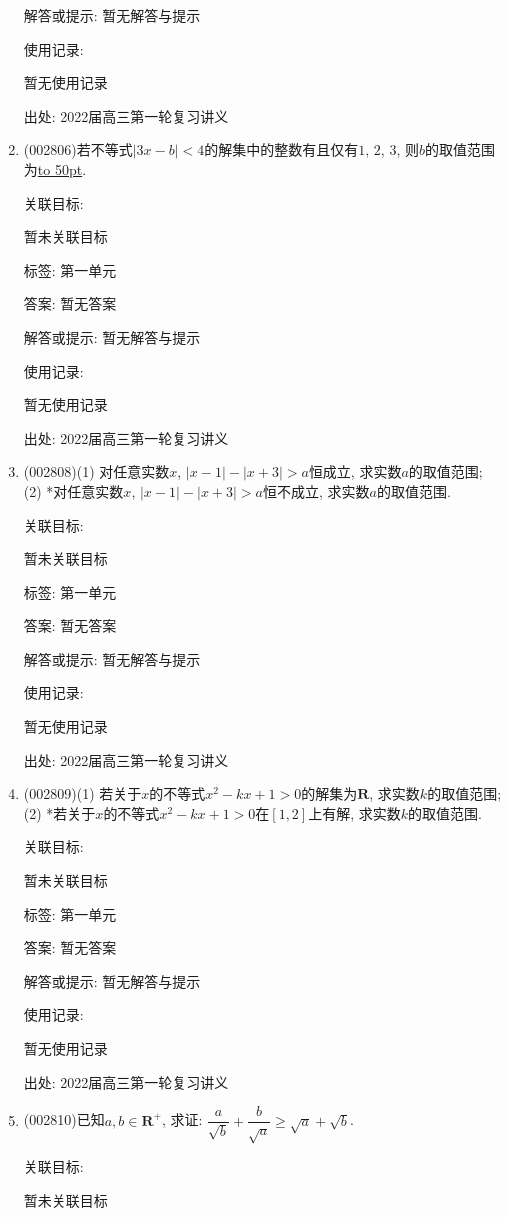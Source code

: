 \documentclass[10pt,a4paper]{article}
\newcommand{\blank}[1]{\underline{\hbox to #1pt{}}}
\begin{document}
\begin{enumerate}[1.]
解答或提示: 暂无解答与提示

使用记录:

暂无使用记录


出处: 2022届高三第一轮复习讲义
\item { (002806)}若不等式$|3x-b|<4$的解集中的整数有且仅有$1$, $2$, $3$, 则$b$的取值范围为\blank{50}.


关联目标:

暂未关联目标



标签: 第一单元

答案: 暂无答案

解答或提示: 暂无解答与提示

使用记录:

暂无使用记录


出处: 2022届高三第一轮复习讲义
\item { (002808)}(1) 对任意实数$x$, $|x-1|-|x+3|>a$恒成立, 求实数$a$的取值范围;\\
(2) *对任意实数$x$, $|x-1|-|x+3|>a$恒不成立, 求实数$a$的取值范围.


关联目标:

暂未关联目标



标签: 第一单元

答案: 暂无答案

解答或提示: 暂无解答与提示

使用记录:

暂无使用记录


出处: 2022届高三第一轮复习讲义
\item { (002809)}(1) 若关于$x$的不等式$x^2-kx+1>0$的解集为$\mathbf{R}$, 求实数$k$的取值范围;\\
(2) *若关于$x$的不等式$x^2-kx+1>0$在$[1,2]$上有解, 求实数$k$的取值范围.


关联目标:

暂未关联目标



标签: 第一单元

答案: 暂无答案

解答或提示: 暂无解答与提示

使用记录:

暂无使用记录


出处: 2022届高三第一轮复习讲义
\item { (002810)}已知$a,b\in \mathbf{R}^+$, 求证: $\dfrac a{\sqrt b}+\dfrac b{\sqrt a}\ge \sqrt a+\sqrt b$.


关联目标:

暂未关联目标




\end{enumerate}
\end{document}
